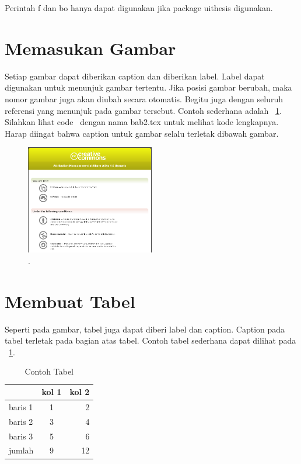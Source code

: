 Perintah \bslash f dan \bslash bo hanya dapat digunakan jika package 
uithesis digunakan. 


\section{Memasukan Gambar}
Setiap gambar dapat diberikan caption dan diberikan label. Label dapat 
digunakan untuk menunjuk gambar tertentu. 
Jika posisi gambar berubah, maka nomor gambar juga akan diubah secara 
otomatis. 
Begitu juga dengan seluruh referensi yang menunjuk pada gambar tersebut. 
Contoh sederhana adalah \pic~\ref{fig:testGambar}. 
Silahkan lihat code \latex~dengan nama bab2.tex untuk melihat kode lengkapnya. 
Harap diingat bahwa caption untuk gambar selalu terletak dibawah gambar. 

\begin{figure}
	\centering
	\includegraphics[width=0.50\textwidth]
		{assets/pics/creative_common.png}
	\caption{\license.}
	\label{fig:testGambar}
\end{figure}


\section{Membuat Tabel}
Seperti pada gambar, tabel juga dapat diberi label dan caption. 
Caption pada tabel terletak pada bagian atas tabel. 
Contoh tabel sederhana dapat dilihat pada \tab~\ref{tab:tab1}.

\begin{table}
	\centering
	\caption{Contoh Tabel}
	\label{tab:tab1}
	\begin{tabular}{| l | c r |}
		\hline
		& kol 1 & kol 2 \\ 
		\hline
		baris 1 & 1 & 2 \\
		baris 2 & 3 & 4 \\
		baris 3 & 5 & 6 \\
		jumlah  & 9 & 12 \\
		\hline
	\end{tabular}
\end{table}

